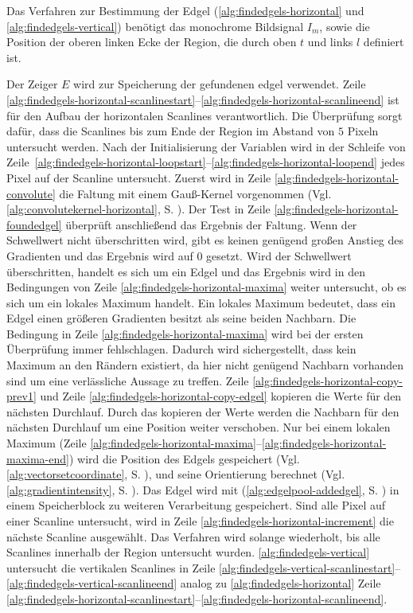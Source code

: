 Das Verfahren zur Bestimmung der Edgel (\autoref{alg:findedgels-horizontal} und \autoref{alg:findedgels-vertical})
 benötigt das monochrome Bildsignal $I_m$, sowie die Position der oberen linken Ecke der Region, die durch oben $t$ und
 links $l$ definiert ist.

Der Zeiger $E$ wird zur Speicherung der gefundenen \gls{edgel} verwendet. Zeile
 \ref{alg:findedgels-horizontal-scanlinestart}--\ref{alg:findedgels-horizontal-scanlineend} ist für den Aufbau der
 horizontalen Scanlines verantwortlich. Die Überprüfung sorgt dafür, dass die Scanlines bis zum Ende der Region im
 Abstand von $5$ Pixeln untersucht werden. Nach der Initialisierung der Variablen wird in der Schleife von
 Zeile~\ref{alg:findedgels-horizontal-loopstart}--\ref{alg:findedgels-horizontal-loopend} jedes Pixel auf der Scanline
 untersucht. Zuerst wird in Zeile \ref{alg:findedgels-horizontal-convolute} die Faltung mit einem Gauß-Kernel
 vorgenommen (Vgl. \autoref{alg:convolutekernel-horizontal}, S. \pageref{alg:convolutekernel-horizontal}). Der Test
 in Zeile \ref{alg:findedgels-horizontal-foundedgel} überprüft anschließend das Ergebnis der Faltung. Wenn der
 Schwellwert nicht überschritten wird, gibt es keinen genügend großen Anstieg des Gradienten und das Ergebnis wird auf
 $0$ gesetzt. Wird der Schwellwert überschritten, handelt es sich um ein Edgel und das Ergebnis wird in den
 Bedingungen von Zeile \ref{alg:findedgels-horizontal-maxima} weiter untersucht, ob es sich um ein lokales Maximum
 handelt. Ein lokales Maximum bedeutet, dass ein Edgel einen größeren Gradienten besitzt als seine beiden Nachbarn. Die
 Bedingung in Zeile \ref{alg:findedgels-horizontal-maxima} wird bei der ersten Überprüfung immer fehlschlagen.
 Dadurch wird sichergestellt, dass kein Maximum an den Rändern existiert, da hier nicht genügend Nachbarn vorhanden sind
 um eine verlässliche Aussage zu treffen. Zeile \ref{alg:findedgels-horizontal-copy-prev1} und
 Zeile \ref{alg:findedgels-horizontal-copy-edgel} kopieren die Werte für den nächsten Durchlauf. Durch das kopieren der
 Werte werden die Nachbarn für den nächsten Durchlauf um eine Position weiter verschoben. Nur bei einem lokalen Maximum
 (Zeile \ref{alg:findedgels-horizontal-maxima}--\ref{alg:findedgels-horizontal-maxima-end}) wird die Position des
 Edgels gespeichert (Vgl. \autoref{alg:vectorsetcoordinate}, S. \pageref{alg:vectorsetcoordinate}), und seine
 Orientierung berechnet (Vgl. \autoref{alg:gradientintensity}, S. \pageref{alg:gradientintensity}). Das Edgel wird mit
  (\autoref{alg:edgelpool-addedgel}, S. \pageref{alg:edgelpool-addedgel}) in einem Speicherblock zu
 weiteren Verarbeitung gespeichert. Sind alle Pixel auf einer Scanline untersucht, wird in Zeile
 \ref{alg:findedgels-horizontal-increment} die nächste Scanline ausgewählt. Das Verfahren wird solange wiederholt, bis
 alle Scanlines innerhalb der Region untersucht wurden. \autoref{alg:findedgels-vertical} untersucht die vertikalen
 Scanlines in Zeile \ref{alg:findedgels-vertical-scanlinestart}--\ref{alg:findedgels-vertical-scanlineend} analog zu
 \autoref{alg:findedgels-horizontal} Zeile
 \ref{alg:findedgels-horizontal-scanlinestart}--\ref{alg:findedgels-horizontal-scanlineend}.


